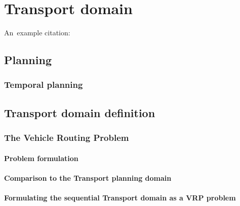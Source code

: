 \chapter{Transport domain}

An~example citation: \cite{Ghallab2004}

\section{Planning}

\subsection{Temporal planning}

\section{Transport domain definition}

\subsection{The Vehicle Routing Problem}

\subsubsection{Problem formulation}

\subsubsection{Comparison to the Transport planning domain}

\subsubsection{Formulating the sequential Transport domain as a VRP problem}
